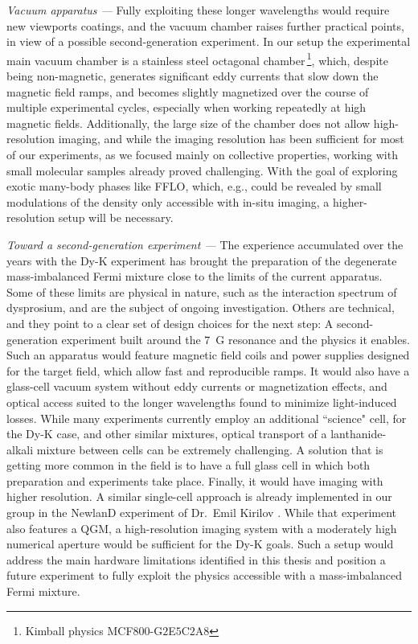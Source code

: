 \textit{Vacuum apparatus ---} Fully exploiting these longer wavelengths would require new viewports coatings, and the vacuum chamber raises further practical points, in view of a possible second-generation experiment. In our setup the experimental main vacuum chamber is a stainless steel octagonal chamber\,\footnote{Kimball physics MCF$800$-G$2$E$5$C$2$A$8$}, which, despite being non-magnetic, generates significant eddy currents that slow down the magnetic field ramps, and becomes slightly magnetized over the course of multiple experimental cycles, especially when working repeatedly at high magnetic fields. Additionally, the large size of the chamber does not allow high-resolution imaging, and while the imaging resolution has been sufficient for most of our experiments, as we focused mainly on collective properties, working with small molecular samples already proved challenging. With the goal of exploring exotic many-body phases like \ac{FFLO}, which, e.g., could be revealed by small modulations of the density \cite{Kinnunen2018tff} only accessible with in-situ imaging, a higher-resolution setup will be necessary. 


\textit{Toward a second-generation experiment ---}
The experience accumulated over the years with the Dy-K experiment has brought the preparation of the degenerate mass-imbalanced Fermi mixture close to the limits of the current apparatus. Some of these limits are physical in nature, such as the interaction spectrum of dysprosium, and are the subject of ongoing investigation. Others are technical, and they point to a clear set of design choices for the next step: A second-generation experiment built around the \SI{7}{G} resonance and the physics it enables. Such an apparatus would feature magnetic field coils and power supplies designed for the target field, which allow fast and reproducible ramps. It would also have a glass-cell vacuum system without eddy currents or magnetization effects, and optical access suited to the longer wavelengths found to minimize light-induced losses. While many experiments currently employ an additional ``science" cell, for the Dy-K case, and other similar mixtures, optical transport of a lanthanide-alkali mixture between cells can be extremely challenging. A solution that is getting more common in the field is to have
a full glass cell in which both preparation and experiments take place. Finally, it would have imaging with higher resolution. A similar single-cell approach is already implemented in our group in the NewlanD experiment of Dr.~Emil Kirilov \cite{Anich2024cco,Hoellrigl2026ssp}. While that experiment also features a \ac{QGM}, a high-resolution imaging system with a moderately high numerical aperture would be sufficient for the Dy-K goals. Such a setup would address the main hardware limitations identified in this thesis and position a future experiment to fully exploit the physics accessible with a mass-imbalanced Fermi mixture.





